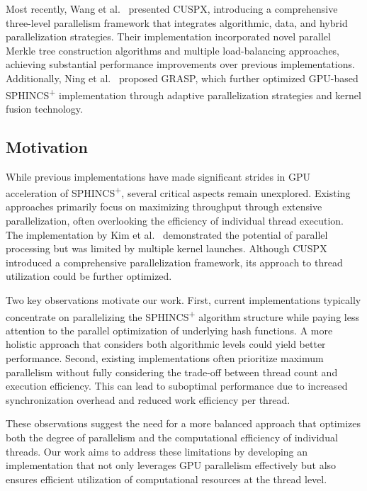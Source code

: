 \documentclass[journal]{IEEEtran}
\begin{document}
Most recently, Wang et al.~\cite{Wang2025} presented CUSPX, introducing a comprehensive three-level parallelism framework that integrates algorithmic, data, and hybrid parallelization strategies. Their implementation incorporated novel parallel Merkle tree construction algorithms and multiple load-balancing approaches, achieving substantial performance improvements over previous implementations. Additionally, Ning et al.~\cite{Ning2024} proposed GRASP, which further optimized GPU-based SPHINCS\textsuperscript{+} implementation through adaptive parallelization strategies and kernel fusion technology.

\subsection{Motivation}

While previous implementations have made significant strides in GPU acceleration of SPHINCS\textsuperscript{+}, several critical aspects remain unexplored. Existing approaches primarily focus on maximizing throughput through extensive parallelization, often overlooking the efficiency of individual thread execution. The implementation by Kim et al.~\cite{Kim2024} demonstrated the potential of parallel processing but was limited by multiple kernel launches. Although CUSPX~\cite{Wang2025} introduced a comprehensive parallelization framework, its approach to thread utilization could be further optimized.

Two key observations motivate our work. First, current implementations typically concentrate on parallelizing the SPHINCS\textsuperscript{+} algorithm structure while paying less attention to the parallel optimization of underlying hash functions. A more holistic approach that considers both algorithmic levels could yield better performance. Second, existing implementations often prioritize maximum parallelism without fully considering the trade-off between thread count and execution efficiency. This can lead to suboptimal performance due to increased synchronization overhead and reduced work efficiency per thread.

These observations suggest the need for a more balanced approach that optimizes both the degree of parallelism and the computational efficiency of individual threads. Our work aims to address these limitations by developing an implementation that not only leverages GPU parallelism effectively but also ensures efficient utilization of computational resources at the thread level.
\end{document}
